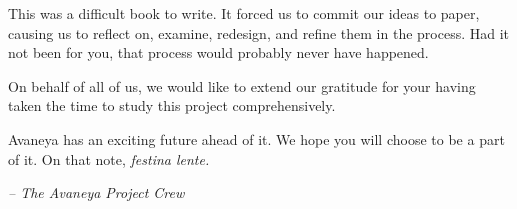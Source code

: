 

This was a difficult book to write. It forced us to commit our ideas to paper, causing us to reflect on, examine, redesign, and refine them in the process. Had it not been for you, that process would probably never have happened. 

On behalf of all of us, we would like to extend our gratitude for your having taken the time to study this project comprehensively. 

Avaneya has an exciting future ahead of it. We hope you will choose to be a part of it. On that note, {\it festina lente.}

\hskip 1.5cm {\it -- The Avaneya Project Crew}

\StopChapter

